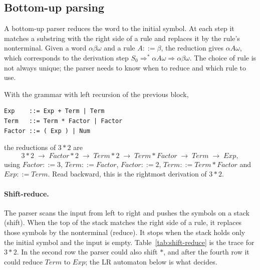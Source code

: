\subsection{Bottom-up parsing}

A bottom-up parser reduces the word to the initial symbol. At each step it
matches a substring with the right side of a rule and replaces it by the
rule's nonterminal. Given a word $\alpha\beta\omega$ and a rule $A ::= \beta$, the
reduction gives $\alpha A \omega$, which corresponds to the derivation step
$S_0 \Rightarrow^* \alpha A \omega \Rightarrow \alpha\beta\omega$. The choice of rule is not
always unique; the parser needs to know when to reduce and which rule to use.

With the grammar with left recursion of the previous block,
\begin{lstlisting}
Exp    ::= Exp + Term | Term
Term   ::= Term * Factor | Factor
Factor ::= ( Exp ) | Num
\end{lstlisting}
the reductions of $3*2$ are
\[
3*2 \;\to\; \mathit{Factor}*2 \;\to\; \mathit{Term}*2 \;\to\; \mathit{Term}*\mathit{Factor}
\;\to\; \mathit{Term} \;\to\; \mathit{Exp},
\]
using $\mathit{Factor} ::= 3$, $\mathit{Term} ::= \mathit{Factor}$, $\mathit{Factor} ::= 2$,
$\mathit{Term} ::= \mathit{Term}*\mathit{Factor}$ and $\mathit{Exp} ::= \mathit{Term}$. Read
backward, this is the rightmost derivation of $3*2$.

\paragraph{Shift-reduce.} The parser scans the input from left to right and
pushes the symbols on a stack (shift). When the top of the stack matches the
right side of a rule, it replaces those symbols by the nonterminal (reduce).
It stops when the stack holds only the initial symbol and the input is
empty. Table~\ref{tab:shift-reduce} is the trace for $3*2$. In the second row
the parser could also shift $*$, and after the fourth row it could reduce
$\mathit{Term}$ to $\mathit{Exp}$; the LR automaton below is what decides.

